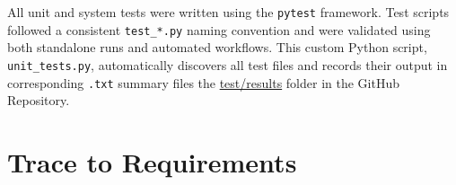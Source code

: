 \documentclass[12pt, titlepage]{article}
\begin{document}
All unit and system tests were written using the \texttt{pytest} framework. Test scripts followed a consistent \texttt{test\_*.py} naming convention and were validated using both standalone runs and automated workflows. This custom Python script, \texttt{unit\_tests.py}, automatically discovers all test files and records their output in corresponding \texttt{.txt} summary files the \href{https://github.com/AliyahJimoh/2D-Localizer/tree/main/test/results}{test/results} folder in the GitHub Repository.

		
\section{Trace to Requirements}
\begin{table}[H]
  \begin{center}
  \caption{Tracibility Matrix Between the Test Cases \& Requirements}
  \end{center}
  \end{table}
		
\end{document}
